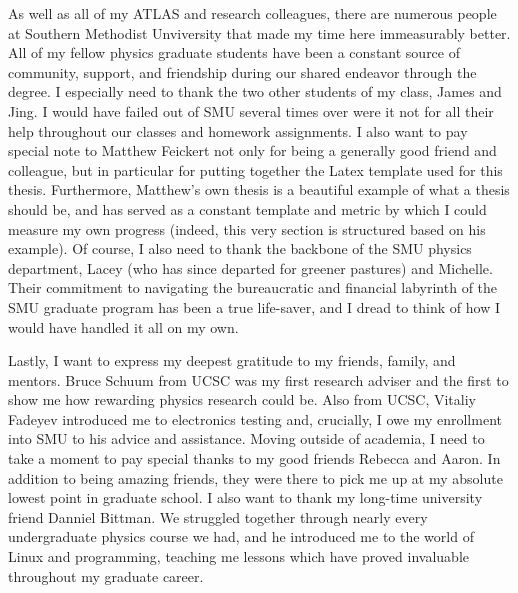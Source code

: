 As well as all of my ATLAS and research colleagues,
    there are numerous people at Southern Methodist Unviversity that made my time here immeasurably better.
All of my fellow physics graduate students have been a constant source of community, support, and friendship
    during our shared endeavor through the degree.
I especially need to thank the two other students of my class, James and Jing.
I would have failed out of SMU several times over were it not
    for all their help throughout our classes and homework assignments.
I also want to pay special note to Matthew Feickert not only for being a generally good friend and colleague,
    but in particular for putting together the Latex template\cite{dedman_latex_git} used for this thesis.
Furthermore, Matthew's own thesis\cite{matthew_feickert} is a beautiful example of what a thesis should be,
    and has served as a constant template and metric by which I could measure my own progress
    (indeed, this very section is structured based on his example).
Of course, I also need to thank the backbone of the SMU physics department, 
    Lacey (who has since departed for greener pastures) and Michelle.
Their commitment to navigating the bureaucratic and financial labyrinth of the SMU graduate program
    has been a true life-saver, and I dread to think of how I would have handled it all on my own.


Lastly, I want to express my deepest gratitude to my friends, family, and mentors.
Bruce Schuum from UCSC was my first research adviser
    and the first to show me how rewarding physics research could be.
Also from UCSC, Vitaliy Fadeyev introduced me to electronics testing
    and, crucially, I owe my enrollment into SMU to his advice and assistance.
Moving outside of academia, I need to take a moment to pay special thanks
    to my good friends Rebecca and Aaron.
In addition to being amazing friends, they were there to pick me up
    at my absolute lowest point in graduate school.
I also want to thank my long-time university friend Danniel Bittman.
We struggled together through nearly every undergraduate physics course we had,
    and he introduced me to the world of Linux and programming,
    teaching me lessons which have proved invaluable throughout my graduate career.

